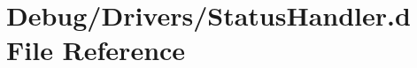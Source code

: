 \hypertarget{_status_handler_8d}{}\section{Debug/\+Drivers/\+Status\+Handler.d File Reference}
\label{_status_handler_8d}
